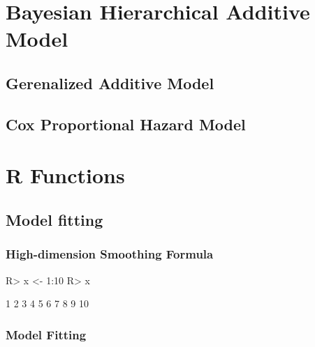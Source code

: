 \documentclass[
]{jss}
\begin{document}
\hypertarget{bayesian-hierarchical-additive-model}{%
\section{Bayesian Hierarchical Additive
Model}\label{bayesian-hierarchical-additive-model}}

\hypertarget{gerenalized-additive-model}{%
\subsection{Gerenalized Additive
Model}\label{gerenalized-additive-model}}

\hypertarget{cox-proportional-hazard-model}{%
\subsection{Cox Proportional Hazard
Model}\label{cox-proportional-hazard-model}}

\hypertarget{r-functions}{%
\section{R Functions}\label{r-functions}}

\hypertarget{model-fitting}{%
\subsection{Model fitting}\label{model-fitting}}

\hypertarget{high-dimension-smoothing-formula}{%
\subsubsection{High-dimension Smoothing
Formula}\label{high-dimension-smoothing-formula}}

\begin{CodeChunk}
\begin{CodeInput}
R> x <- 1:10
R> x
\end{CodeInput}
\begin{CodeOutput}
 [1]  1  2  3  4  5  6  7  8  9 10
\end{CodeOutput}
\end{CodeChunk}

\hypertarget{model-fitting-1}{%
\subsubsection{Model Fitting}\label{model-fitting-1}}
\end{document}
